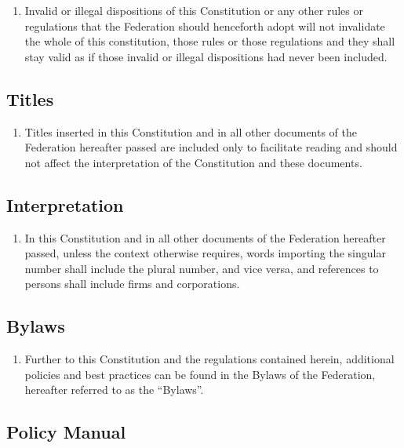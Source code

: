 \begin{enumerate}
 \item Invalid or illegal dispositions of this Constitution or any other rules or regulations that the Federation should henceforth adopt will not invalidate the whole of this constitution, those rules or those regulations and they shall stay valid as if those invalid or illegal dispositions had never been included.
\end{enumerate}

\subsection{Titles}
\label{titles}

\begin{enumerate}
 \item Titles inserted in this Constitution and in all other documents of the Federation hereafter passed are included only to facilitate reading and should not affect the interpretation of the Constitution and these documents.
\end{enumerate}

\subsection{Interpretation}
\label{interpretation}

\begin{enumerate}
 \item In this Constitution and in all other documents of the Federation hereafter passed, unless the context otherwise requires, words importing the singular number shall include the plural number, and vice versa, and references to persons shall include firms and corporations.
\end{enumerate}

\subsection{Bylaws}
\label{bylaws}

\begin{enumerate}
 \item Further to this Constitution and the regulations contained herein, additional policies and best practices can be found in the Bylaws of the Federation, hereafter referred to as the “Bylaws”.
\end{enumerate}

\subsection{Policy Manual}
\label{policy-manual}

